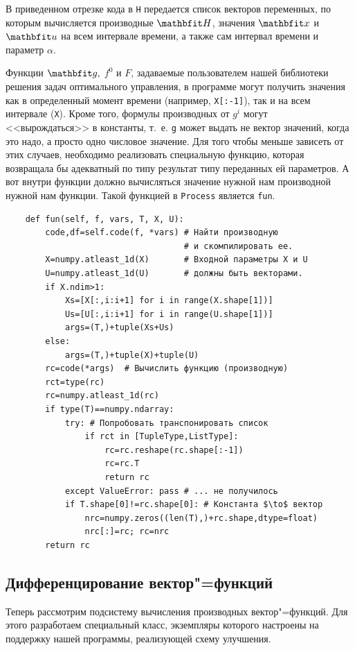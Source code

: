 \documentclass[a4paper,14pt, openany, twoside, final]{extbook} %
\begin{document}
В приведенном отрезке кода в \texttt{H} передается список векторов переменных, по которым вычисляется производные $\vecH$, значения $\vecx$ и $\vecu$ на всем интервале времени, а также сам интервал времени и параметр $\alpha$.

Функции $\vecg,$ $f^0$ и $F$, задаваемые пользователем нашей библиотеки решения задач оптимального управления, в программе могут получить значения как в определенный момент времени (например, \texttt{X[:-1]}), так и на всем интервале (\texttt{X}).  Кроме того, формулы производных от $g^i$ могут <<вырождаться>> в константы, т.~е. \texttt{g} может выдать не вектор значений, когда это надо, а просто одно числовое значение.  Для того чтобы меньше зависеть от этих случаев, необходимо реализовать специальную функцию, которая возвращала бы адекватный по типу результат типу переданных ей параметров.  А вот внутри функции должно вычисляться значение нужной нам производной нужной нам функции.  Такой функцией в \texttt{Process} является \texttt{fun}.

\begin{verbatim}
    def fun(self, f, vars, T, X, U):
        code,df=self.code(f, *vars) # Найти производную
                                    # и скомпилировать ее.
        X=numpy.atleast_1d(X)       # Входной параметры X и U
        U=numpy.atleast_1d(U)       # должны быть векторами.
        if X.ndim>1:
            Xs=[X[:,i:i+1] for i in range(X.shape[1])]
            Us=[U[:,i:i+1] for i in range(U.shape[1])]
            args=(T,)+tuple(Xs+Us)
        else:
            args=(T,)+tuple(X)+tuple(U)
        rc=code(*args)  # Вычислить функцию (производную)
        rct=type(rc)
        rc=numpy.atleast_1d(rc)
        if type(T)==numpy.ndarray:
            try: # Попробовать транспонировать список
                if rct in [TupleType,ListType]:
                    rc=rc.reshape(rc.shape[:-1])
                    rc=rc.T
                    return rc
            except ValueError: pass # ... не получилось
            if T.shape[0]!=rc.shape[0]: # Константа $\to$ вектор
                nrc=numpy.zeros((len(T),)+rc.shape,dtype=float)
                nrc[:]=rc; rc=nrc
        return rc
\end{verbatim}

\subsection{Дифференцирование вектор"=функций}
\label{sec:VFdiff}

Теперь рассмотрим подсистему вычисления производных вектор"=функций.  Для этого разработаем специальный класс, экземпляры которого настроены на поддержку нашей программы, реализующей схему улучшения.
\end{document}
